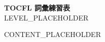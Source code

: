 \documentclass[{PAPER_SIZE}paper,12pt]{ctexart}
\begin{document}
\begin{center}
{\LARGE\bfseries TOCFL 詞彙練習表} \\
\vspace{0.5cm}
{LEVEL_PLACEHOLDER}
\end{center}

{CONTENT_PLACEHOLDER}
\end{document}
